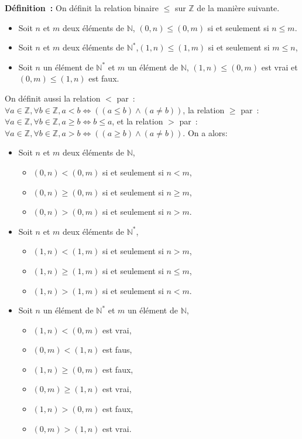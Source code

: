 \noindent\textbf{Définition :} 
    On définit la relation binaire $\leq$ sur $\mathbb{Z}$ de la manière suivante. 
    \begin{itemize}[nosep]
        \item Soit $n$ et $m$ deux éléments de $\mathbb{N}$, $(0,n) \leq (0,m)$ si et seulement si $n \leq m$. 
        \item Soit $n$ et $m$ deux éléments de $\mathbb{N}^*$,$(1,n) \leq (1,m)$ si et seulement si $m \leq n$,
        \item Soit $n$ un élément de $\mathbb{N}^*$ et $m$ un élément de $\mathbb{N}$, $(1,n) \leq (0,m)$ est vrai et $(0,m) \leq (1,n)$ est faux.
    \end{itemize}
    On définit aussi la relation $<$ par : $\forall a \in \mathbb{Z}, \forall b \in \mathbb{Z}, a < b \Leftrightarrow ((a \leq b) \wedge (a \neq b))$, la relation $\geq$ par : $\forall a \in \mathbb{Z}, \forall b \in \mathbb{Z}, a \geq b \Leftrightarrow b \leq a$, et la relation $>$ par : $\forall a \in \mathbb{Z}, \forall b \in \mathbb{Z}, a > b \Leftrightarrow ((a \geq b) \wedge (a \neq b))$.
    On a alors: 
    \begin{itemize}[nosep]
        \item Soit $n$ et $m$ deux éléments de $\mathbb{N}$, 
            \begin{itemize}[nosep]
                \item $(0,n) < (0,m)$ si et seulement si $n < m$,
                \item $(0,n) \geq (0,m)$ si et seulement si $n \geq m$,
                \item $(0,n) > (0,m)$ si et seulement si $n > m$.
            \end{itemize}
        \item Soit $n$ et $m$ deux éléments de $\mathbb{N}^*$,
            \begin{itemize}[nosep]
                \item $(1,n) < (1,m)$ si et seulement si $n > m$,
                \item $(1,n) \geq (1,m)$ si et seulement si $n \leq m$,
                \item $(1,n) > (1,m)$ si et seulement si $n < m$.
            \end{itemize}
        \item Soit $n$ un élément de $\mathbb{N}^*$ et $m$ un élément de $\mathbb{N}$, 
            \begin{itemize}[nosep]
                \item $(1,n) < (0,m)$ est vrai,
                \item $(0,m) < (1,n)$ est faus,
                \item $(1,n) \geq (0,m)$ est faux,
                \item $(0,m) \geq (1,n)$ est vrai,
                \item $(1,n) > (0,m)$ est faux,
                \item $(0,m) > (1,n)$ est vrai.
            \end{itemize}
    \end{itemize}

